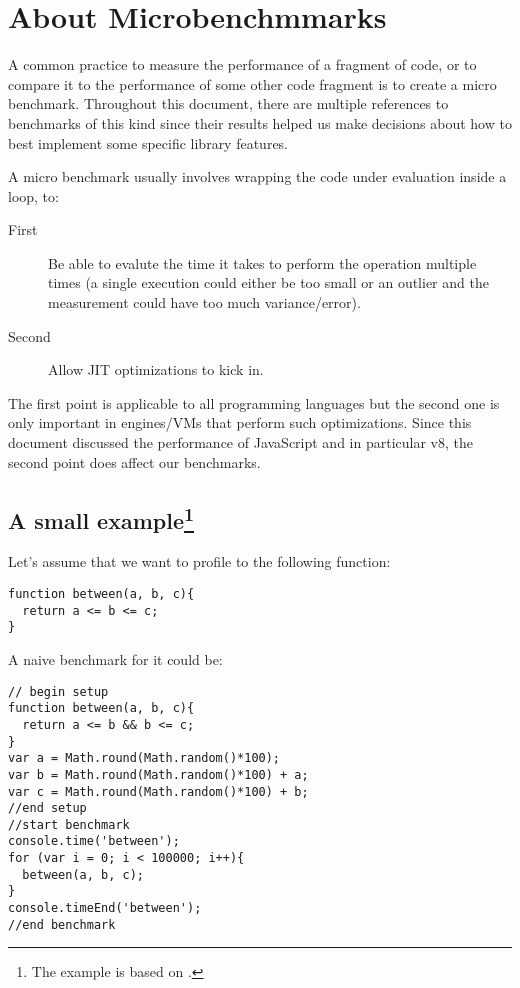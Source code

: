 \section{About Microbenchmmarks}
A common practice to measure the performance of a fragment of code, or to compare it to the performance of some other code fragment is to create a micro benchmark. Throughout this document, there are multiple references to benchmarks of this kind since their results helped us make decisions about how to best implement some specific library features.

A micro benchmark usually involves wrapping the code under evaluation inside a loop, to:

\begin{description}
\item[First] Be able to evalute the time it takes to perform the operation multiple times (a single execution could either be too small or an outlier and the measurement could have too much variance/error).
\item[Second] Allow JIT optimizations to kick in.
\end{description}

The first point is applicable to all programming languages but the second one is only important in engines/VMs that perform such optimizations. Since this document discussed the performance of JavaScript and in particular v8, the second point does affect our benchmarks.

\subsection{A small example\protect\footnote{The example is based on \cite{mraleph-bc}.}}
Let's assume that we want to profile to the following function:
\begin{lstlisting}[caption=Function to benchmark]
function between(a, b, c){
  return a <= b <= c;
}
\end{lstlisting}

A naive benchmark for it could be:
\begin{lstlisting}[caption=Naive benchmark]
// begin setup
function between(a, b, c){
  return a <= b && b <= c;
}
var a = Math.round(Math.random()*100);
var b = Math.round(Math.random()*100) + a;
var c = Math.round(Math.random()*100) + b;
//end setup
//start benchmark
console.time('between');
for (var i = 0; i < 100000; i++){
  between(a, b, c);
}
console.timeEnd('between');
//end benchmark
\end{lstlisting}

